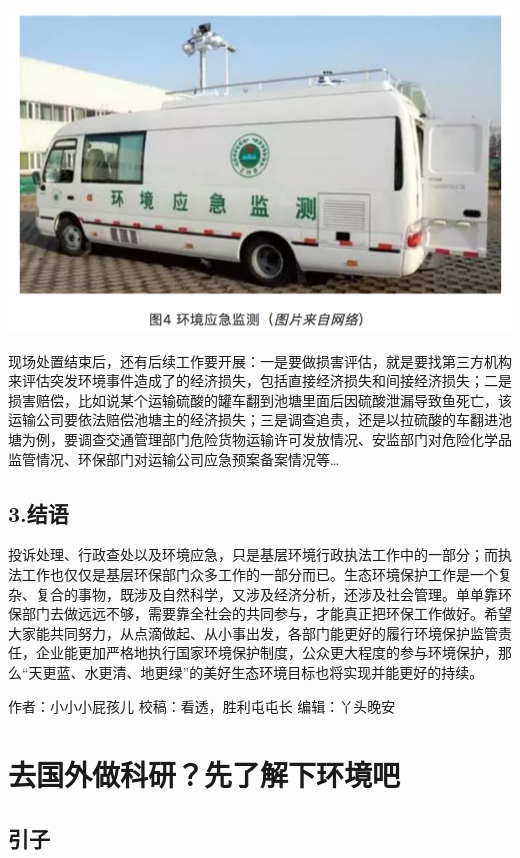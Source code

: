 \documentclass[]{book}
\begin{document}
\includegraphics[width=8.33in]{images/hjzf4}

现场处置结束后，还有后续工作要开展：一是要做损害评估，就是要找第三方机构来评估突发环境事件造成了的经济损失，包括直接经济损失和间接经济损失；二是损害赔偿，比如说某个运输硫酸的罐车翻到池塘里面后因硫酸泄漏导致鱼死亡，该运输公司要依法赔偿池塘主的经济损失；三是调查追责，还是以拉硫酸的车翻进池塘为例，要调查交通管理部门危险货物运输许可发放情况、安监部门对危险化学品监管情况、环保部门对运输公司应急预案备案情况等\ldots{}

\subsection{3.结语}\label{-9}

投诉处理、行政查处以及环境应急，只是基层环境行政执法工作中的一部分；而执法工作也仅仅是基层环保部门众多工作的一部分而已。生态环境保护工作是一个复杂、复合的事物，既涉及自然科学，又涉及经济分析，还涉及社会管理。单单靠环保部门去做远远不够，需要靠全社会的共同参与，才能真正把环保工作做好。希望大家能共同努力，从点滴做起、从小事出发，各部门能更好的履行环境保护监管责任，企业能更加严格地执行国家环境保护制度，公众更大程度的参与环境保护，那么``天更蓝、水更清、地更绿''的美好生态环境目标也将实现并能更好的持续。

作者：小小小屁孩儿 校稿：看透，胜利屯屯长 编辑：丫头晚安

\section{去国外做科研？先了解下环境吧}

\subsection{引子}
\end{document}

